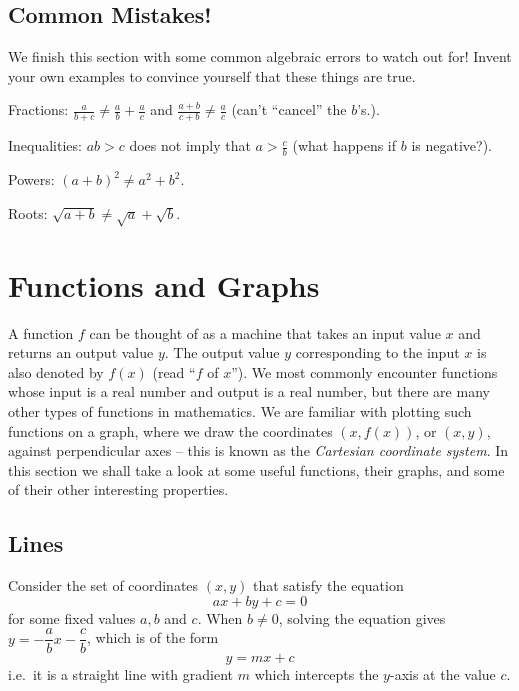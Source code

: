 \documentclass[
]{book}
\theoremstyle{definition}
\theoremstyle{definition}
\theoremstyle{definition}
\theoremstyle{definition}
\theoremstyle{remark}
\begin{document}
\hypertarget{common-mistakes}{%
\section{Common Mistakes!}\label{common-mistakes}}

We finish this section with some common algebraic errors to watch out for! Invent your own examples to convince yourself that these things are true.

Fractions: \(\frac{a}{b+c}\neq \frac{a}{b}+\frac{a}{c}\) and \(\frac{a+b}{c+b}\neq\frac{a}{c}\) (can't ``cancel'' the \(b\)'s.).

Inequalities: \(ab>c\) does not imply that \(a>\frac{c}{b}\) (what happens if \(b\) is negative?).

Powers: \((a+b)^2\neq a^2+b^2\).

Roots: \(\sqrt{a+b}\neq \sqrt{a}+\sqrt{b}\).

\hypertarget{functions-and-graphs}{%
\chapter{Functions and Graphs}\label{functions-and-graphs}}

A function \(f\) can be thought of as a machine that takes an input value \(x\) and returns an output value \(y\). The output value \(y\) corresponding to the input \(x\) is also denoted by \(f(x)\) (read ``\(f\) of \(x\)''). We most commonly encounter functions whose input is a real number and output is a real number, but there are many other types of functions in mathematics. We are familiar with plotting such functions on a graph, where we draw the coordinates \((x,f(x))\), or \((x,y)\), against perpendicular axes -- this is known as the \emph{Cartesian coordinate system}. In this section we shall take a look at some useful functions, their graphs, and some of their other interesting properties.

\hypertarget{lines}{%
\section{Lines}\label{lines}}

Consider the set of coordinates \((x,y)\) that satisfy the equation
\[ax+by+c=0\]
for some fixed values \(a,b\) and \(c\). When \(b\neq0\), solving the equation gives \(y=-\dfrac{a}{b}x-\dfrac{c}{b}\), which is of the form
\[y=mx+c\]
i.e.~it is a straight line with gradient \(m\) which intercepts the \(y\)-axis at the value \(c\).
\end{document}
